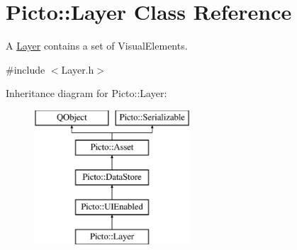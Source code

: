 \hypertarget{class_picto_1_1_layer}{\section{Picto\-:\-:Layer Class Reference}
\label{class_picto_1_1_layer}
}


A \hyperlink{class_picto_1_1_layer}{Layer} contains a set of Visual\-Elements.  




{\ttfamily \#include $<$Layer.\-h$>$}

Inheritance diagram for Picto\-:\-:Layer\-:\begin{figure}[H]
\begin{center}
\leavevmode
\includegraphics[height=5.000000cm]{class_picto_1_1_layer}
\end{center}
\end{figure}
